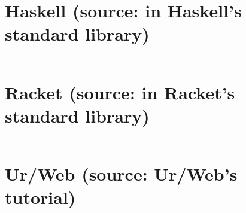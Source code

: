 \documentclass{article}
\begin{document}
\section*{Haskell (source: \texttt{} in Haskell's standard library)}

\begin{verbatim}

\end{verbatim}

\section*{Racket (source: \texttt{} in Racket's standard library)}

\begin{verbatim}

\end{verbatim}

\section*{Ur/Web (source: Ur/Web's tutorial)}

\begin{verbatim}

\end{verbatim}
\end{document}
